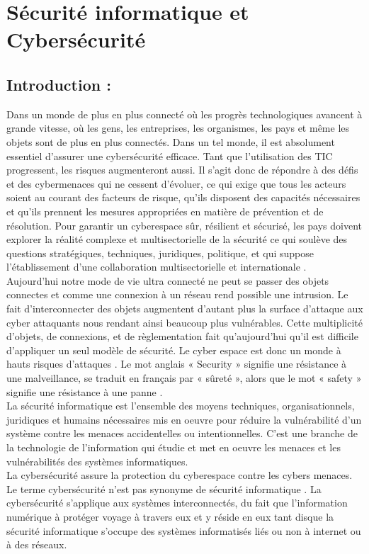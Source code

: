 
\chapter{Sécurité informatique et Cybersécurité} 
\minitoc
\thispagestyle{empty}
\newpage
\section{Introduction : }

Dans un monde de plus en plus connecté où les progrès technologiques avancent à grande vitesse, où les gens, les entreprises, les organismes, les pays et même les objets sont de plus en plus connectés.
Dans un tel monde, il est absolument essentiel d'assurer une cybersécurité efficace. Tant que l'utilisation des TIC progressent, les risques augmenteront aussi. Il s'agit donc de répondre à des défis et des cybermenaces qui ne cessent d'évoluer, ce qui exige que tous les acteurs soient au courant des facteurs de risque, qu'ils disposent des capacités nécessaires et qu'ils prennent les mesures appropriées en matière de prévention et de résolution. Pour garantir un cyberespace sûr, résilient et sécurisé, les pays doivent explorer la réalité complexe et multisectorielle de la sécurité ce qui soulève des questions stratégiques, techniques, juridiques, politique, et qui suppose l'établissement d'une collaboration multisectorielle et internationale \cite{securite}.\\

Aujourd’hui notre mode de vie ultra connecté ne peut se passer des objets connectes et comme une connexion à un réseau rend possible une intrusion. Le fait d’interconnecter des objets augmentent d’autant plus la surface d’attaque aux cyber attaquants nous rendant ainsi beaucoup plus vulnérables. Cette multiplicité d’objets, de connexions, et de règlementation fait qu’aujourd’hui qu’il est difficile d’appliquer un seul modèle de sécurité. Le cyber espace est donc un monde à hauts risques d’attaques \cite{dangercyberespace}. Le mot anglais « Security » signifie une résistance à une malveillance, se traduit en français par « sûreté », alors que le mot « safety » signifie une résistance à une panne \cite{ref4ex}.\\

La sécurité informatique est l’ensemble des moyens techniques, organisationnels, juridiques et humains nécessaires mis en oeuvre pour réduire la vulnérabilité d’un système contre les menaces accidentelles ou intentionnelles. C’est une branche de la technologie de l’information qui étudie et met en oeuvre les menaces et les vulnérabilités des systèmes informatiques.\\
La cybersécurité assure la protection du cyberespace contre les cybers menaces. Le terme cybersécurité n’est pas synonyme de sécurité informatique\cite{ref1} . La cybersécurité s’applique aux systèmes interconnectés, du fait que l’information numérique à protéger voyage à travers eux et y réside en eux tant disque la sécurité informatique s'occupe des systèmes informatisés liés ou non à internet ou à des réseaux\cite{ref1e2}.

